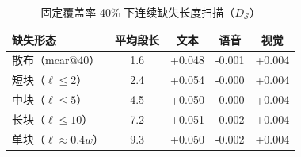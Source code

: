 \begin{table}[H]
  \centering
\caption{固定覆盖率 40\% 下连续缺失长度扫描（$D_{\mathcal{S}}$）}
\label{tab:p2-blocklen}
  \small
  \begin{tabularx}{\textwidth}{@{}Xcccc@{}}
    \toprule
    缺失形态 & 平均段长 & 文本 & 语音 & 视觉 \\
    \midrule
    散布（mcar@40） & 1.6 & +0.048 & -0.001 & +0.004 \\
    短块（$\ell\le 2$） & 2.4 & +0.054 & -0.000 & +0.004 \\
    中块（$\ell\le 5$） & 4.5 & +0.050 & -0.000 & +0.004 \\
    长块（$\ell\le 10$） & 7.2 & +0.051 & -0.002 & +0.004 \\
    单块（$\ell\approx 0.4w$） & 9.3 & +0.050 & -0.002 & +0.004 \\
    \bottomrule
  \end{tabularx}
  \par \smallskip
  \end{table}
